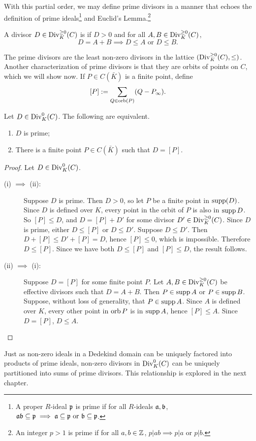 With this partial order, we may define prime divisors in a manner that echoes
the definition of prime ideals\footnote{
A proper $R$-ideal $\frak p$ is prime if for all $R$-ideals $\frak a, \frak b$,
$\frak{ab} \subseteq \frak p \implies \frak a \subseteq \frak p \text{ or } \frak b \subseteq \frak p$.}
and Euclid's Lemma.\!\footnote{
An integer $p > 1$ is prime if for all $a,b \in \mathbb{Z}$, $p | ab \implies p | a \text{ or } p | b$.}
\begin{definition}
  A divisor $D \in \operatorname{Div}_K^{\geq 0}(C)$ is  if $D > 0$ and for all $A, B \in \operatorname{Div}_K^{\geq 0}(C)$,
  \[ D = A + B \implies D \leq A \text{ or } D \leq B. \]
\end{definition}
The prime divisors are the least non-zero divisors in the lattice $(\operatorname{Div}_K^{\geq 0}(C), \leq)$.
Another characterization of prime divisors is that they are orbits of points on $C$, which we will show now.
If $P \in C(\bar K)$ is a finite point, define
\[ [P] := \sum_{Q \in \operatorname{orb}(P)}(Q - P_\infty). \]
\begin{proposition}
  \label{prop_prime_divisors}
  Let $D \in \operatorname{Div}_K^0(C)$. The following are equivalent.
  \begin{enumerate}[label=(\roman*)]
    \item $D$ is prime;
    \item There is a finite point $P \in C(\bar K)$ such that $D = [P]$.
  \end{enumerate}
\end{proposition}
\begin{proof}
  Let $D \in \operatorname{Div}_K^0(C)$.
  \begin{description}
    \item[(i) $\implies$ (ii):]
      Suppose $D$ is prime.
      Then $D > 0$, so let $P$ be a finite point in $\operatorname{supp}(D)$.
      Since $D$ is defined over $K$, every point in the orbit of $P$ is also in $\operatorname{supp} D$.
      So $[P] \leq D$, and $D = [P] + D'$ for some divisor $D' \in \operatorname{Div}_K^{\geq 0}(C)$.
      Since $D$ is prime, either $D \leq [P]$ or $D \leq D'$.
      Suppose $D \leq D'$.
      Then $D + [P] \leq D' + [P] = D$, hence $[P] \leq 0$, which is impossible.
      Therefore $D \leq [P]$.
      Since we have both $D \leq [P]$ and $[P] \leq D$, the result follows.
      
    \item[(ii) $\implies$ (i):]
      Suppose $D = [P]$ for some finite point $P$.
      Let $A, B \in \operatorname{Div}_K^{\geq 0}(C)$ be effective divisors such that $D = A + B$.
      Then $P \in \operatorname{supp} A$ or $P \in \operatorname{supp} B$.
      Suppose, without loss of generality, that $P \in \operatorname{supp} A$.
      Since $A$ is defined over $K$, every other point in $\operatorname{orb} P$ is in $\operatorname{supp} A$, hence $[P] \leq A$.
      Since $D = [P]$, $D \leq A$.
  \end{description}
\end{proof}

Just as non-zero ideals in a Dedekind domain can be uniquely factored into products of prime ideals,
non-zero divisors in $\operatorname{Div}_K^0(C)$ can be uniquely partitioned into sums of prime divisors.
This relationship is explored in the next chapter.
